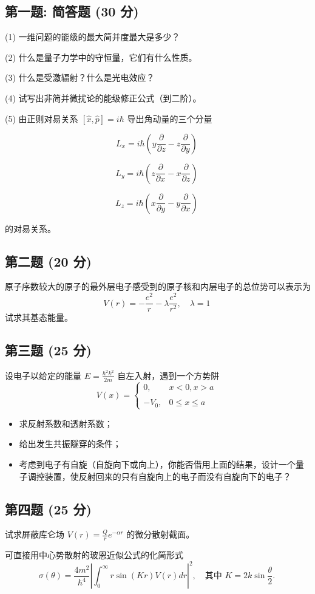 

\subsection{第一题: 简答题 (30 分)}

(1) 一维问题的能级的最大简并度最大是多少？

(2) 什么是量子力学中的守恒量，它们有什么性质。

(3) 什么是受激辐射？什么是光电效应？

(4) 试写出非简并微扰论的能级修正公式（到二阶）。

(5) 由正则对易关系 $[\hat{x}, \hat{p}] = i\hbar$ 导出角动量的三个分量

\[L_x = i \hbar \left( y \frac{\partial}{\partial z} - z \frac{\partial}{\partial y} \right)~\]

\[L_y = i \hbar \left( z \frac{\partial}{\partial x} - x \frac{\partial}{\partial z} \right)~\]

\[L_z = i \hbar \left( x \frac{\partial}{\partial y} - y \frac{\partial}{\partial x} \right)~\]

的对易关系。
\subsection{第二题 (20 分)}
原子序数较大的原子的最外层电子感受到的原子核和内层电子的总位势可以表示为
\[V(r) = -\frac{e^2}{r} - \lambda \frac{e^2}{r^2}, \quad \lambda = 1~\]
试求其基态能量。
\subsection{第三题 (25 分)}
设电子以给定的能量 $E = \frac{h^2 k^2}{2m}$ 自左入射，遇到一个方势阱
\[V(x) = \begin{cases} 0, & x < 0, x > a \\\\-V_0, & 0 \leq x \leq a \end{cases}~\]
\begin{itemize}
  \item 求反射系数和透射系数；
  \item 给出发生共振隧穿的条件；
  \item 考虑到电子有自旋（自旋向下或向上），你能否借用上面的结果，设计一个量子调控装置，使反射回来的只有自旋向上的电子而没有自旋向下的电子？
\end{itemize}
\subsection{第四题 (25 分)}
试求屏蔽库仑场 $V(r) = \frac{Q}{r}e^{-\alpha r}$ 的微分散射截面。

 可直接用中心势散射的玻恩近似公式的化简形式
\[\sigma(\theta) = \frac{4m^2}{\hbar^4} \left| \int_0^\infty r \sin(Kr) V(r) dr \right|^2, \quad \text{其中 } K = 2k \sin\frac{\theta}{2}.~\]
